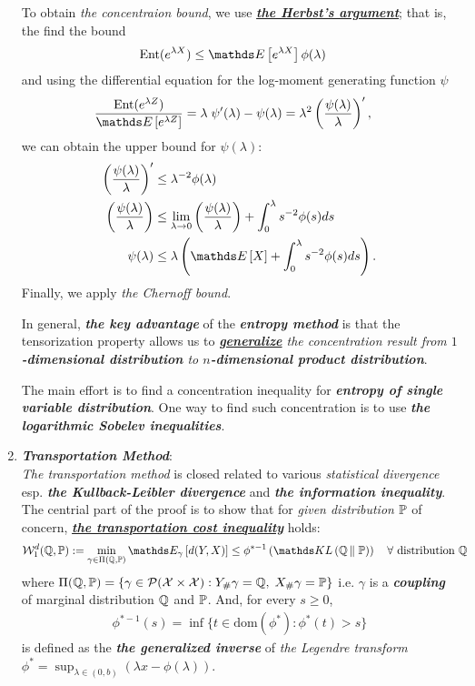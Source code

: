 \documentclass[11pt]{article}
\begin{document}
\begin{enumerate}
To obtain \emph{the concentraion bound}, we use \underline{\emph{\textbf{the Herbst's argument}}}; that is, the find the bound 
\begin{align*}
\text{Ent}(e^{\lambda X})& \le \E{}{e^{\lambda X}} \phi(\lambda) 
\end{align*} and using the differential equation for the log-moment generating function $\psi$
\begin{align*}
\frac{\text{Ent}(e^{\lambda Z})}{\E{}{e^{\lambda Z}}} &= \lambda\; \psi'(\lambda) - \psi(\lambda) = \lambda^2 \paren{\frac{ \psi(\lambda)}{\lambda}}',
\end{align*} we can obtain the upper bound for $\psi(\lambda)$:
\begin{align*}
 \paren{\frac{ \psi(\lambda)}{\lambda}}' &\le  \lambda^{-2}\phi(\lambda) \\
 \paren{\frac{ \psi(\lambda)}{\lambda}} &\le \lim\limits_{\lambda \to 0}\paren{\frac{ \psi(\lambda)}{\lambda}} + \int_{0}^{\lambda}s^{-2}\phi(s) ds \\
 \psi(\lambda) &\le \lambda\paren{\E{}{X} + \int_{0}^{\lambda}s^{-2}\phi(s) ds}. 
\end{align*} Finally, we apply \emph{the Chernoff bound}.
 
In general, \emph{\textbf{the key advantage}} of the \emph{\textbf{entropy method}} is that the tensorization property allows us to \emph{\underline{\textbf{generalize}} the concentration result from \textbf{$1$-dimensional distribution} to \textbf{$n$-dimensional product distribution}}. 

The main effort is to find a concentration inequality for \emph{\textbf{entropy of single variable distribution}}. One way to find such concentration is to use  \emph{\textbf{the logarithmic Sobelev inequalities}}.


\item \emph{\textbf{Transportation Method}}:\\
\emph{The transportation method} is closed related to various \emph{statistical divergence} esp. \emph{\textbf{the Kullback-Leibler divergence}} and \emph{\textbf{the information inequality}}. The centrial part of the proof is to show that for \emph{given distribution} ${\mathbb P}$ of concern, \underline{\emph{\textbf{the transportation cost inequality}}} holds:
\begin{align*}
\cW_{1}^{d}(\bQ, \bP) := \min_{\gamma \in \Pi(\bQ, \bP)}\E{\gamma}{d(Y, X)} &\le \phi^{*-1}\paren{\kl{\bQ}{\bP}} \quad \forall \text{ distribution } \bQ
\end{align*} where $\Pi({\mathbb Q}, {\mathbb P})= \left\{ \gamma \in {\mathcal P}({\mathcal X} \times {\mathcal X}):  Y_{\#}\gamma = {\mathbb Q}, \; X_{\#}\gamma = {\mathbb P} \right\}$ i.e. $\gamma$ is a \emph{\textbf{coupling}} of marginal distribution  ${\mathbb Q}$ and ${\mathbb P}$. And, for every $s \ge 0$, 
\begin{align*}
\phi^{*-1}(s) = \inf\{t \in \text{dom}(\phi^{*}): \phi^{*}(t) > s\}
\end{align*}  is defined as the \textbf{\emph{the generalized inverse}} of \emph{the Legendre transform} $\phi^{*}= \sup_{\lambda \in (0,b)}(\lambda x - \phi(\lambda))$. 


\end{enumerate}
\end{document}
